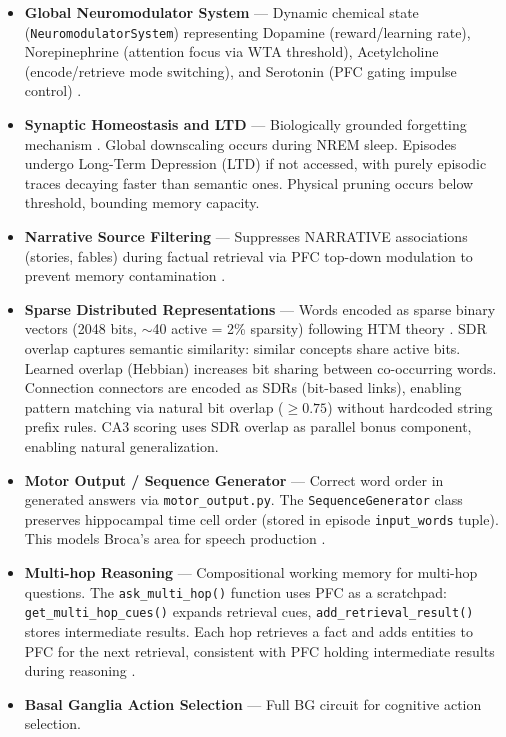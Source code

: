 \documentclass[11pt]{article}
\begin{document}
\begin{itemize}
\item \textbf{Global Neuromodulator System} --- Dynamic chemical state (\texttt{NeuromodulatorSystem}) representing Dopamine (reward/learning rate), Norepinephrine (attention focus via WTA threshold), Acetylcholine (encode/retrieve mode switching), and Serotonin (PFC gating impulse control) \citep{hasselmo2006role}.
\item \textbf{Synaptic Homeostasis and LTD} --- Biologically grounded forgetting mechanism \citep{tononi2006sleep}. Global downscaling occurs during NREM sleep. Episodes undergo Long-Term Depression (LTD) if not accessed, with purely episodic traces decaying faster than semantic ones. Physical pruning occurs below threshold, bounding memory capacity.
\item \textbf{Narrative Source Filtering} --- Suppresses NARRATIVE associations (stories, fables) during factual retrieval via PFC top-down modulation to prevent memory contamination \citep{tulving1972episodic}.
\item \textbf{Sparse Distributed Representations} --- Words encoded as sparse binary vectors (2048 bits, $\sim$40 active = 2\% sparsity) following HTM theory \citep{hawkins2004intelligence}. SDR overlap captures semantic similarity: similar concepts share active bits. Learned overlap (Hebbian) increases bit sharing between co-occurring words. Connection connectors are encoded as SDRs (bit-based links), enabling pattern matching via natural bit overlap ($\ge 0.75$) without hardcoded string prefix rules. CA3 scoring uses SDR overlap as parallel bonus component, enabling natural generalization.
\item \textbf{Motor Output / Sequence Generator} --- Correct word order in generated answers
      via \texttt{motor\_output.py}. The \texttt{SequenceGenerator} class preserves hippocampal time cell order
      (stored in episode \texttt{input\_words} tuple). This models Broca's area for speech production
      \citep{hickok2007cortical}.
\item \textbf{Multi-hop Reasoning} --- Compositional working memory for multi-hop questions.
      The \texttt{ask\_multi\_hop()} function uses PFC as a scratchpad: \texttt{get\_multi\_hop\_cues()} expands
      retrieval cues, \texttt{add\_retrieval\_result()} stores intermediate results. Each hop retrieves a fact
      and adds entities to PFC for the next retrieval, consistent with PFC holding intermediate results
      during reasoning \citep{miller2001integrative}.
\item \textbf{Basal Ganglia Action Selection} --- Full BG circuit for cognitive action selection.

\end{itemize}
\end{document}
